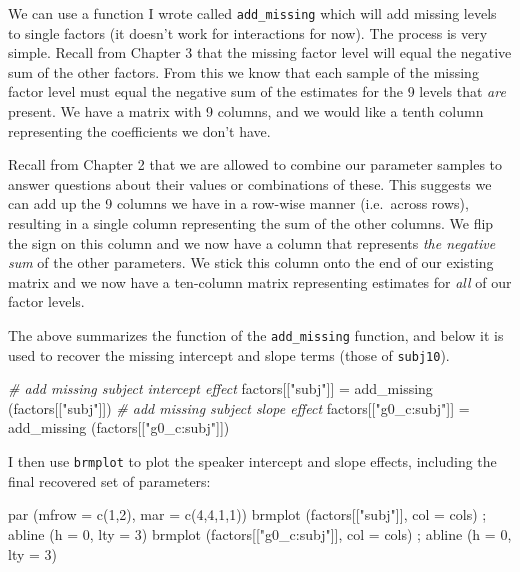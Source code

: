 \documentclass[
]{book}
\newenvironment{Shaded}{\begin{snugshade}}{\end{snugshade}}
\newcommand{\AttributeTok}[1]{\textcolor[rgb]{0.77,0.63,0.00}{#1}}
\newcommand{\CommentTok}[1]{\textcolor[rgb]{0.56,0.35,0.01}{\textit{#1}}}
\newcommand{\DecValTok}[1]{\textcolor[rgb]{0.00,0.00,0.81}{#1}}
\newcommand{\FunctionTok}[1]{\textcolor[rgb]{0.00,0.00,0.00}{#1}}
\newcommand{\NormalTok}[1]{#1}
\newcommand{\OtherTok}[1]{\textcolor[rgb]{0.56,0.35,0.01}{#1}}
\newcommand{\StringTok}[1]{\textcolor[rgb]{0.31,0.60,0.02}{#1}}
\begin{document}
We can use a function I wrote called \texttt{add\_missing} which will add missing levels to single factors (it doesn't work for interactions for now). The process is very simple. Recall from Chapter 3 that the missing factor level will equal the negative sum of the other factors. From this we know that each sample of the missing factor level must equal the negative sum of the estimates for the 9 levels that \emph{are} present. We have a matrix with 9 columns, and we would like a tenth column representing the coefficients we don't have.

Recall from Chapter 2 that we are allowed to combine our parameter samples to answer questions about their values or combinations of these. This suggests we can add up the 9 columns we have in a row-wise manner (i.e.~across rows), resulting in a single column representing the sum of the other columns. We flip the sign on this column and we now have a column that represents \emph{the negative sum} of the other parameters. We stick this column onto the end of our existing matrix and we now have a ten-column matrix representing estimates for \emph{all} of our factor levels.

The above summarizes the function of the \texttt{add\_missing} function, and below it is used to recover the missing intercept and slope terms (those of \texttt{subj10}).

\begin{Shaded}
\begin{Highlighting}[]
\CommentTok{\# add missing subject intercept effect}
\NormalTok{factors[[}\StringTok{"subj"}\NormalTok{]] }\OtherTok{=} \FunctionTok{add\_missing}\NormalTok{ (factors[[}\StringTok{"subj"}\NormalTok{]])}
\CommentTok{\# add missing subject slope effect}
\NormalTok{factors[[}\StringTok{"g0\_c:subj"}\NormalTok{]] }\OtherTok{=} \FunctionTok{add\_missing}\NormalTok{ (factors[[}\StringTok{"g0\_c:subj"}\NormalTok{]])}
\end{Highlighting}
\end{Shaded}

I then use \texttt{brmplot} to plot the speaker intercept and slope effects, including the final recovered set of parameters:

\begin{Shaded}
\begin{Highlighting}[]
\FunctionTok{par}\NormalTok{ (}\AttributeTok{mfrow =} \FunctionTok{c}\NormalTok{(}\DecValTok{1}\NormalTok{,}\DecValTok{2}\NormalTok{), }\AttributeTok{mar =} \FunctionTok{c}\NormalTok{(}\DecValTok{4}\NormalTok{,}\DecValTok{4}\NormalTok{,}\DecValTok{1}\NormalTok{,}\DecValTok{1}\NormalTok{))}
\FunctionTok{brmplot}\NormalTok{ (factors[[}\StringTok{"subj"}\NormalTok{]], }\AttributeTok{col =}\NormalTok{ cols) ; }\FunctionTok{abline}\NormalTok{ (}\AttributeTok{h =} \DecValTok{0}\NormalTok{, }\AttributeTok{lty =} \DecValTok{3}\NormalTok{)}
\FunctionTok{brmplot}\NormalTok{ (factors[[}\StringTok{"g0\_c:subj"}\NormalTok{]], }\AttributeTok{col =}\NormalTok{ cols) ; }\FunctionTok{abline}\NormalTok{ (}\AttributeTok{h =} \DecValTok{0}\NormalTok{, }\AttributeTok{lty =} \DecValTok{3}\NormalTok{)}
\end{Highlighting}
\end{Shaded}
\end{document}
